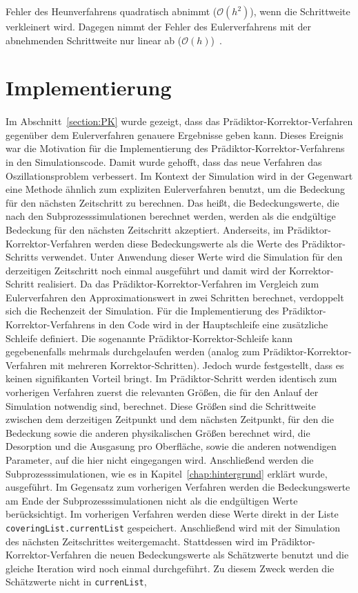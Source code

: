 \documentclass{listhesis}
\begin{document}
Fehler des Heunverfahrens quadratisch abnimmt ($\mathcal{O}(h^2)$), wenn die Schrittweite verkleinert wird. Dagegen nimmt der Fehler des Eulerverfahrens mit der abnehmenden Schrittweite nur linear ab ($\mathcal{O}(h)$)~\cite{ulbrich}.

\section{Implementierung} 
\label{section:implement}
\paragraph{}
Im Abschnitt~\ref{section:PK} wurde gezeigt, dass das Prädiktor-Korrektor-Verfahren gegen\-über dem Eulerverfahren genauere Ergebnisse geben kann. Dieses Ereignis war die Motivation für die Implementierung des Prädiktor-Korrektor-Verfahrens in den Simulationscode. Damit wurde gehofft, dass das neue Verfahren das Oszillationsproblem verbessert. Im Kontext der Simulation wird in der Gegenwart eine Methode ähnlich zum expliziten Eulerverfahren benutzt, um die Bedeckung für den nächsten Zeitschritt zu berechnen. Das heißt, die Bedeckungswerte, die nach den Subprozesssimulationen berechnet werden, werden als die endgültige Bedeckung für den nächsten Zeitschritt akzeptiert. Anderseits, im Prädiktor-Korrektor-Verfahren werden diese Bedeckungswerte als die Werte des Prädiktor-Schritts verwendet. Unter Anwendung dieser Werte wird die Simulation für den derzeitigen Zeitschritt noch einmal ausgeführt und damit wird der Korrektor-Schritt realisiert. Da das Prädiktor-Korrektor-Verfahren im Vergleich zum Eulerverfahren den Approximationswert in zwei Schritten berechnet, verdoppelt sich die Rechenzeit der Simulation. Für die Implementierung des Prädiktor-Korrektor-Verfahrens in den Code wird in der Hauptschleife eine zusätzliche Schleife definiert. Die sogenannte Prädiktor-Korrektor-Schleife kann gegebenenfalls mehrmals durchgelaufen werden (analog zum Prädiktor-Korrektor-Verfahren mit mehreren Korrektor-Schritten). Jedoch wurde festgestellt, dass es keinen signifikanten Vorteil bringt. Im Prädiktor-Schritt werden identisch zum vorherigen Verfahren zuerst die relevanten Größen, die für den Anlauf der Simulation notwendig sind, berechnet. Diese Größen sind die Schrittweite zwischen dem derzeitigen Zeitpunkt und dem nächsten Zeitpunkt, für den die Bedeckung sowie die anderen physikalischen Größen berechnet wird, die Desorption und die Ausgasung pro Oberfläche, sowie die anderen notwendigen Parameter, auf die hier nicht eingegangen wird. Anschließend werden die Subprozesssimulationen, wie es in Kapitel~\ref{chap:hintergrund} erklärt wurde, ausgeführt. Im Gegensatz zum vorherigen Verfahren werden die Bedeckungswerte am Ende der Subprozesssimulationen nicht als die endgültigen Werte berücksichtigt. Im vorherigen Verfahren werden diese Werte direkt in der Liste \texttt{coveringList.currentList} gespeichert. Anschließend wird mit der Simulation des nächsten Zeitschrittes weitergemacht. Stattdessen wird im Prädiktor-Korrektor-Verfahren die neuen Bedeckungswerte als Schätzwerte benutzt und die gleiche Iteration wird noch einmal durchgeführt. Zu diesem Zweck werden die Schätzwerte nicht in \texttt{currenList}, 
\end{document}
